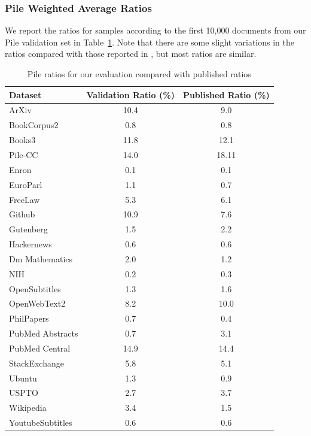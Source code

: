 \documentclass[table]{article}
\begin{document}
\subsubsection{Pile Weighted Average Ratios}

We report the ratios for samples according to the first 10,000 documents from our Pile validation set in Table~\ref{tab:ratios}.  Note that there are some slight variations in the ratios compared with those reported in \citep{gao2020pile}, but most ratios are similar.
\begin{table}
    \centering
    \begin{tabular}{lcc}
    \toprule
       Dataset  & Validation Ratio (\%) & Published Ratio (\%) \\\hline
       ArXiv  & 10.4 & 9.0\\
       BookCorpus2 & 0.8 & 0.8\\
       Books3 & 11.8 & 12.1\\
       Pile-CC & 14.0 & 18.11\\
       Enron & 0.1 & 0.1\\
       EuroParl & 1.1 & 0.7\\
       FreeLaw & 5.3 & 6.1\\
       Github & 10.9 & 7.6\\
       Gutenberg & 1.5 & 2.2\\
       Hackernews & 0.6 & 0.6\\
       Dm Mathematics & 2.0 & 1.2\\
       NIH & 0.2 & 0.3\\
       OpenSubtitles & 1.3 & 1.6\\
       OpenWebText2 & 8.2 & 10.0\\
       PhilPapers & 0.7 & 0.4\\
       PubMed Abstracts & 0.7 & 3.1\\
       PubMed Central & 14.9 & 14.4\\
       StackExchange & 5.8 & 5.1\\
       Ubuntu & 1.3 & 0.9\\
       USPTO & 2.7 & 3.7\\
       Wikipedia & 3.4 & 1.5\\
       YoutubeSubtitles & 0.6 & 0.6\\
       \bottomrule
    \end{tabular}
    \caption{Pile ratios for our evaluation compared with published ratios}
    \label{tab:ratios}
\end{table}
\end{document}
